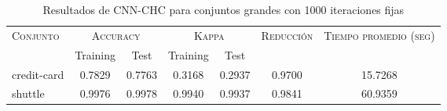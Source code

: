 \begin{table}[]
\centering
\begin{tabular}{l c c c c c c}
\hline
\multirow{2}{*}{\textsc{Conjunto}}
	& \multicolumn{2}{c}{\textsc{Accuracy}}
	& \multicolumn{2}{c}{\textsc{Kappa}}
	& \textsc{Reducción}
	& \textsc{Tiempo promedio (seg)} \\
	& Training & Test
	& Training & Test \\ 
\hline
\hline

credit-card & 0.7829 & 0.7763 & 0.3168 & 0.2937 & 0.9700 & 15.7268 \\
shuttle & 0.9976 & 0.9978 & 0.9940 & 0.9937 & 0.9841 & 60.9359 \\

\hline
\end{tabular}
\caption{Resultados de CNN-CHC para conjuntos grandes con 1000 iteraciones fijas}
\label{res-grande-CNN-CHC}
\end{table}


